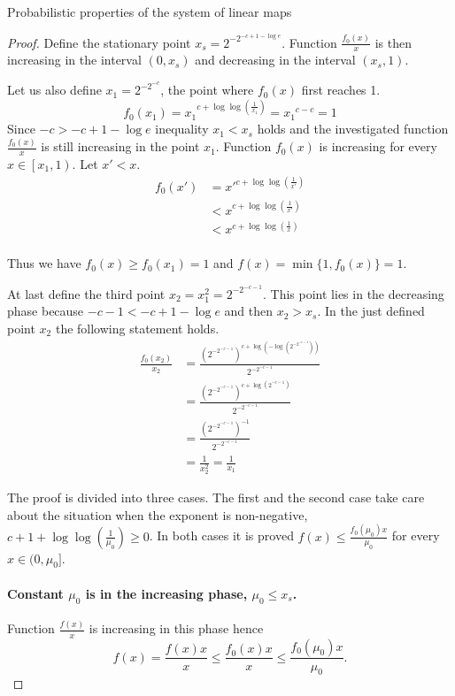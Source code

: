 \begin{section}{Probabilistic properties of the system of linear maps}
\begin{proof}
Define the stationary point $x_s = 2 ^ {-2 ^ {-c + 1 - \log e}}$. Function $\frac{f_0(x)}{x}$ is then increasing in the interval $(0, x_s)$ and decreasing in the interval $(x_s, 1)$. 

Let us also define $x_1 = 2 ^ {-2 ^ {-c}}$, the point where $f_0(x)$ first reaches 1.
\[
f_0(x_1) = {x_1} ^ {c + \log \log \left(\frac{1}{x_1}\right)} = {x_1} ^ {c - c} = 1
\]
Since $-c > -c + 1 -\log e$ inequality $x_1 < x_s$ holds and the investigated function $\frac{f_0(x)}{x}$ is still increasing in the point $x_1$.
Function $f_0(x)$ is increasing for every $x \in \left[x_1, 1\right)$. Let $x' < x$.
\[
\begin{split}
f_0(x') 
	& = {x'} ^ {c + \log \log \left(\frac{1}{x'}\right)} \\
	& < {x} ^ {c + \log \log \left(\frac{1}{x'}\right)} \\
	& < {x} ^ {c + \log \log \left(\frac{1}{x}\right)} \\
\end{split}
\]

Thus we have $f_0(x) \geq f_0(x_1) = 1$ and $f(x) = \min \{1, f_0(x)\} = 1$.

At last define the third point $x_2 = x_1 ^ 2 = 2 ^ {-2 ^ {-c - 1}}$. This point lies in the decreasing phase because $-c - 1 < -c + 1 - \log e$ and then $x_2 > x_s$. In the just defined point $x_2$ the following statement holds.
\[
\begin{split}
\frac{f_0(x_2)}{x_2} 
	& = \frac{\left(2 ^ {-2 ^ {-c - 1}}\right) ^ {c + \log \left(- \log \left(2 ^ {-2 ^ {-c - 1}}\right)\right)}}{2 ^ {-2 ^ {-c - 1}}} \\
	& = \frac{\left(2 ^ {-2 ^ {-c - 1}}\right) ^ {c + \log \left(2 ^ {-c - 1}\right)}}{2 ^ {-2 ^ {-c - 1}}} \\
	& = \frac{\left(2 ^ {-2 ^ {-c - 1}}\right) ^ {-1}}{2 ^ {-2 ^ {-c - 1}}} \\
	& = \frac{1}{x_2^2} = \frac{1}{x_1}
\end{split}
\]

The proof is divided into three cases. The first and the second case take care about the situation when the exponent is non-negative, $c + 1 + \log \log \left(\frac{1}{\mu_0}\right) \geq 0$. In both cases it is proved $f(x) \leq \frac{f_0(\mu_0)x}{\mu_0}$ for every $x \in (0, \mu_0]$.
\paragraph{Constant $\mu_0$ is in the increasing phase, $\mu_0 \leq x_s$.}
Function $\frac{f(x)}{x}$ is increasing in this phase hence
\[
f(x) = \frac{f(x)x}{x} \leq \frac{f_0(x)x}{x} \leq \frac{f_0(\mu_0)x}{\mu_0} \text{.}
\]


\end{proof}
\end{section}
